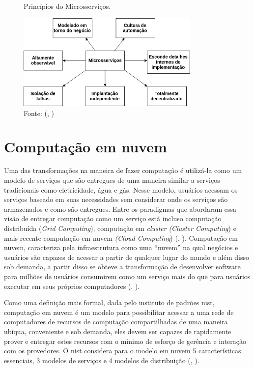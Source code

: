 \documentclass[]{politex}
\begin{document}
\begin{figure}[H]
    \centering
    \caption{Princípios do Microsserviços.}
    \includegraphics[width=0.8\textwidth]{microservices}
    \caption*{Fonte: (, \citeyear{Newman})}
    \label{fig:newman}
\end{figure}

\section{Computação em nuvem} \label{comp_nuvem}
Uma das transformações na maneira de fazer computação é utilizá-la como um modelo de serviços que são entregues de uma maneira similar a serviços tradicionais como eletricidade, água e gás. Nesse modelo, usuários acessam os serviços baseado em suas necessidades sem considerar onde os serviços são armazenados e como são entregues. Entre os paradigmas que abordaram essa visão de entregar computação como um serviço está incluso computação distribuída (\textit{Grid Computing}), computação em \textit{cluster} \textit{(Cluster Computing}) e mais recente computação em nuvem \textit{(Cloud Computing}) (, \citeyear{Buyya}).
Computação em nuvem, caracteriza pela infraestrutura como uma “nuvem” na qual negócios e usuários são capazes de acessar a partir de qualquer lugar do mundo e além disso sob demanda, a partir disso se obteve a transformação de desenvolver software para milhões de usuários consumirem como um serviço mais do que para usuários executar em seus próprios computadores (, \citeyear{Buyya}).

Como uma definição mais formal, dada pelo instituto de padrões \acrshort{nist}, computação em nuvem é um modelo para possibilitar acessar a uma rede de computadores de recursos de computação compartilhadas de uma maneira ubíqua, conveniente e sob demanda, eles devem ser capazes de rapidamente prover e entregar estes recursos com o mínimo de esforço de gerência e interação com os provedores. O \acrshort{nist} considera para o modelo em nuvem 5 características essenciais, 3 modelos de serviços e 4 modelos de distribuição (, \citeyear{nist}).
\end{document}
